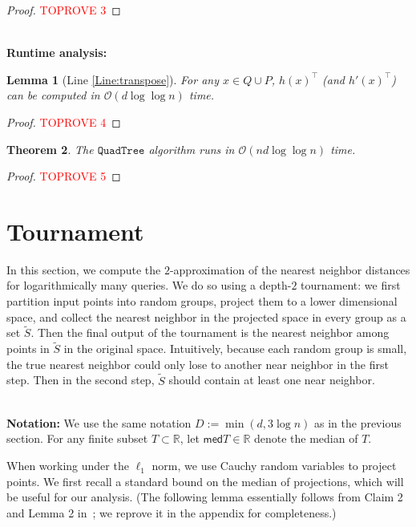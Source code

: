 \documentclass[11pt]{article}
\newcommand{\med}{\mathsf{med}}
\theoremstyle{plain}
\newtheorem{theorem}{Theorem}[section]
\newtheorem{lem}[theorem]{Lemma}
\newcommand{\OO}{\mathcal{O}}
\newcommand{\R}{\mathbb{R}}
\newcommand{\QuadTree}{\texttt{QuadTree}} \usepackage{microtype}
\begin{document}
\begin{proof}\textcolor{red}{TOPROVE 3}\end{proof}
\ \\
{\bf Runtime analysis:}  




\begin{lem}[Line \ref{Line:transpose}]
    For any $x \in Q\cup P$, $h(x)^\top$ (and $h'(x)^\top$) can be computed in $\OO(d \log \log n)$ time.
    
\end{lem}

\begin{proof}\textcolor{red}{TOPROVE 4}\end{proof}

\begin{theorem}
    The $\QuadTree$ algorithm runs in $\OO(nd \log\log n)$ time.
\end{theorem}

\begin{proof}\textcolor{red}{TOPROVE 5}\end{proof} \section{Tournament}
\label{s:tour}
In this section, we compute the $2$-approximation of the nearest neighbor distances for logarithmically many queries. We do so using a depth-$2$ tournament: we first partition input points into random groups, project them to a lower dimensional space, and collect the nearest neighbor in the projected space in every group as a set $\tilde{S}$. Then the final output of the tournament is the nearest neighbor among points in $\tilde{S}$ in the original space. Intuitively, because each random group is small,  the true nearest neighbor could only lose to another near neighbor in the first step. Then in the second step, $\tilde{S}$ should contain at least one near neighbor.

\ \\
{\bf Notation:} We use the same notation ${{D}} := \min{(d, 3\log n)}$ as in the previous section. For any finite subset $T \subset \R$, let $\med T \in \R$ denote the median of $T$.

When working under the $\ell_1$ norm, we use Cauchy random variables to project points. We first recall a standard bound on the median of projections, which will be useful for our analysis. (The following lemma essentially follows from Claim 2 and Lemma 2 in~\cite{indyk2006stable}; we reprove it in the appendix for completeness.)
\end{document}
